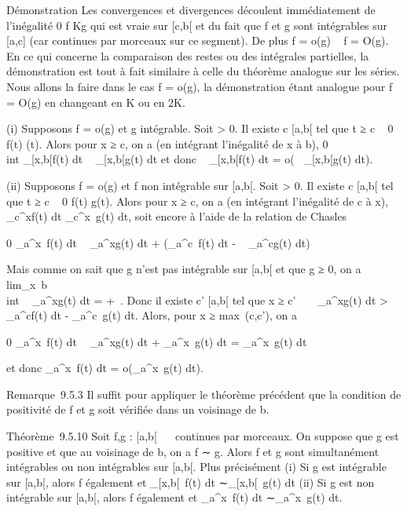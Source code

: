 \documentclass[]{article}
\begin{document}
Démonstration Les convergences et divergences découlent immédiatement de
l'inégalité 0 \leq f \leq Kg qui est vraie sur [c,b[ et du fait que f et g
sont intégrables sur [a,c] (car continues par morceaux sur ce
segment). De plus f = o(g) \rigtharrow~ f = O(g). En ce qui concerne la comparaison
des restes ou des intégrales partielles, la démonstration est tout à
fait similaire à celle du théorème analogue sur les séries. Nous allons
la faire dans le cas f = o(g), la démonstration étant analogue pour f =
O(g) en changeant \epsilon en K ou en 2K.

(i) Supposons f = o(g) et g intégrable. Soit \epsilon > 0. Il
existe c \in [a,b[ tel que t ≥ c \rigtharrow~ 0 \leq f(t) \leq \epsilong(t). Alors pour x ≥ c,
on a (en intégrant l'inégalité de x à b), 0 \leq\\int
 _[x,b[f(t) dt \leq \epsilon\int ~
_[x,b[g(t) dt et donc \int ~
_[x,b[f(t) dt = o(\int ~
_[x,b[g(t) dt).

(ii) Supposons f = o(g) et f non intégrable sur [a,b[. Soit \epsilon
> 0. Il existe c \in [a,b[ tel que t ≥ c \rigtharrow~ 0 \leq f(t) \leq \epsilon
{} g(t). Alors pour x ≥ c, on a (en intégrant
l'inégalité de c à x), \int ~
_c^xf(t) dt \leq \epsilon {}
\int  _c^x~g(t) dt, soit encore à
l'aide de la relation de Chasles

0 \leq\int  _a^x~f(t) dt \leq \epsilon
{} \int ~
_a^xg(t) dt + \left
(\int  _a^c~f(t) dt - \epsilon
{} \int ~
_a^cg(t) dt\right )

Mais comme on sait que g n'est pas intégrable sur [a,b[ et que g ≥
0, on a
lim_x\rightarrow~b\\int ~
_a^xg(t) dt = +\infty~. Donc il existe c' \in [a,b[ tel que x
≥ c' \rigtharrow~ \epsilon {} \int ~
_a^xg(t) dt >\int ~
_a^cf(t) dt - \epsilon {}
\int  _a^c~g(t) dt. Alors, pour x
≥ max~(c,c'), on a

0 \leq\int  _a^x~f(t) dt \leq \epsilon
{} \int ~
_a^xg(t) dt + \epsilon {}
\int  _a^x~g(t) dt =
\epsilon\int  _a^x~g(t) dt

et donc \int  _a^x~f(t) dt =
o(\int  _a^x~g(t) dt).

Remarque~9.5.3 Il suffit pour appliquer le théorème précédent que la
condition de positivité de f et g soit vérifiée dans un voisinage de b.

Théorème~9.5.10 Soit f,g : [a,b[\rightarrow~ ~ continues par morceaux. On
suppose que g est positive et que au voisinage de b, on a f ∼ g. Alors f
et g sont simultanément intégrables ou non intégrables sur [a,b[.
Plus précisément (i) Si g est intégrable sur [a,b[, alors f
également et \int  _[x,b[~f(t) dt
∼\int  _[x,b[~g(t) dt (ii) Si g est
non intégrable sur [a,b[, alors f également et
\int  _a^x~f(t) dt
∼\int  _a^x~g(t) dt.
\end{document}
